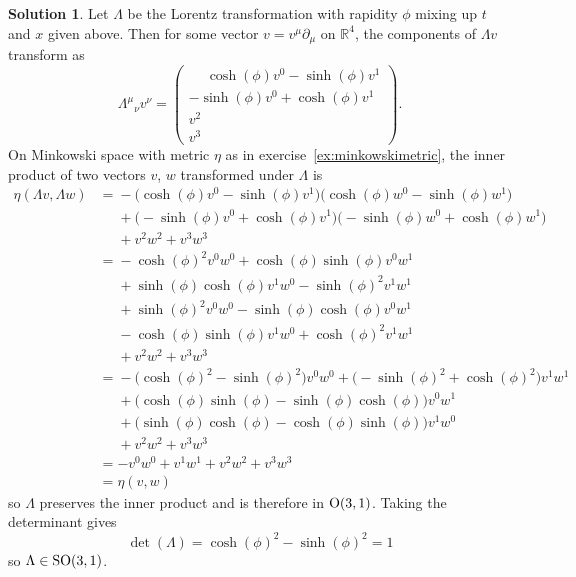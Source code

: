\documentclass[11pt, a4paper]{report}
\theoremstyle{definition}
\newtheorem{sol}{Solution}[part]
\renewcommand*{\O}{\ensuremath\text{O}}
\newcommand*{\SO}{\ensuremath\text{SO}}
\begin{document}
\begin{sol}

Let $\Lambda$ be the Lorentz transformation with rapidity $\phi$ mixing up $t$ and $x$ given above.
Then for some vector $v = v^\mu \partial_\mu$ on $\mathbb{R}^4$, the components of $\Lambda v$ transform as
\[
    {\Lambda^\mu}_\nu v^\nu = \begin{pmatrix}
        \phantom{-} \cosh(\phi) v^0 - \sinh(\phi) v^1 \\
        -\sinh(\phi) v^0 + \cosh(\phi) v^1 \\
        v^2 \\
        v^3
    \end{pmatrix}.
\]
On Minkowski space with metric $\eta$ as in exercise~\ref{ex:minkowskimetric}, the inner product of two vectors $v$, $w$ transformed under $\Lambda$ is
\begin{align*}
    \eta(\Lambda v, \Lambda w)
        &\mathrel{=}{} - \bigl(\cosh(\phi) v^0 - \sinh(\phi) v^1 \bigr)
            \bigl( \cosh(\phi) w^0 - \sinh(\phi) w^1 \bigr) \\
        &\mathrel{\phantom{=}}{} + \bigl(-\sinh(\phi) v^0 + \cosh(\phi) v^1 \bigr)
                                   \bigl(-\sinh(\phi) w^0 + \cosh(\phi) w^1 \bigr) \\
        &\mathrel{\phantom{=}}{} + v^2 w^2 + v^3 w^3 \\
        &\mathrel{=}{} - {\cosh(\phi)}^2 v^0 w^0 + \cosh(\phi) \sinh(\phi) v^0 w^1 \\
        &\mathrel{\phantom{=}}{} + \sinh(\phi) \cosh(\phi) v^1 w^0 - {\sinh(\phi)}^2 v^1 w^1 \\
        &\mathrel{\phantom{=}}{} + {\sinh(\phi)}^2 v^0 w^0 - \sinh(\phi) \cosh(\phi) v^0 w^1 \\
        &\mathrel{\phantom{=}}{} - \cosh(\phi) \sinh(\phi) v^1 w^0 + {\cosh(\phi)}^2 v^1 w^1 \\
        &\mathrel{\phantom{=}}{} + v^2 w^2 + v^3 w^3 \\
        &\mathrel{=}{} - \bigl( {\cosh(\phi)}^2 - {\sinh(\phi)}^2 \bigr) v^0 w^0
                       + \bigl( -{\sinh(\phi)}^2 + {\cosh(\phi)}^2) v^1 w^1 \\
        &\mathrel{\phantom{=}}{} + \bigl( \cosh(\phi) \sinh(\phi) - \sinh(\phi) \cosh(\phi) \bigr) v^0 w^1 \\
        &\mathrel{\phantom{=}}{} + \bigl( \sinh(\phi) \cosh(\phi) - \cosh(\phi) \sinh(\phi) \bigr) v^1 w^0 \\
        &\mathrel{\phantom{=}}{} + v^2 w^2 + v^3 w^3 \\
        &= - v^0 w^0 + v^1 w^1 + v^2 w^2 + v^3 w^3 \\
        &= \eta(v, w)
\end{align*}
so $\Lambda$ preserves the inner product and is therefore in $\O(3, 1)$.
Taking the determinant gives
\[
    \det(\Lambda) = {\cosh(\phi)}^2 - {\sinh(\phi)}^2 = 1
\]
so $\Lambda \in \SO(3, 1)$.


\end{sol}
\end{document}
